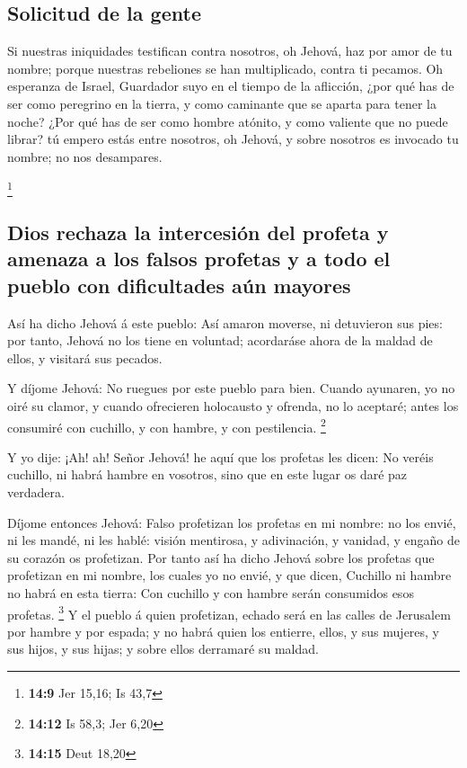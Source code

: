 \hypertarget{solicitud-de-la-gente}{%
\subsection{Solicitud de la gente}\label{solicitud-de-la-gente}}

 Si nuestras iniquidades testifican contra nosotros, oh
Jehová, haz por amor de tu nombre; porque nuestras rebeliones se han
multiplicado, contra ti pecamos.  Oh esperanza de Israel,
Guardador suyo en el tiempo de la aflicción, ¿por qué has de ser como
peregrino en la tierra, y como caminante que se aparta para tener la
noche?  ¿Por qué has de ser como hombre atónito, y como
valiente que no puede librar? tú empero estás entre nosotros, oh Jehová,
y sobre nosotros es invocado tu nombre; no nos desampares.

\footnote{\textbf{14:9} Jer 15,16; Is 43,7}

\hypertarget{dios-rechaza-la-intercesiuxf3n-del-profeta-y-amenaza-a-los-falsos-profetas-y-a-todo-el-pueblo-con-dificultades-auxfan-mayores}{%
\subsection{Dios rechaza la intercesión del profeta y amenaza a los
falsos profetas y a todo el pueblo con dificultades aún
mayores}\label{dios-rechaza-la-intercesiuxf3n-del-profeta-y-amenaza-a-los-falsos-profetas-y-a-todo-el-pueblo-con-dificultades-auxfan-mayores}}

 Así ha dicho Jehová á este pueblo: Así amaron moverse,
ni detuvieron sus pies: por tanto, Jehová no los tiene en voluntad;
acordaráse ahora de la maldad de ellos, y visitará sus pecados.

 Y díjome Jehová: No ruegues por este pueblo para bien.
 Cuando ayunaren, yo no oiré su clamor, y cuando
ofrecieren holocausto y ofrenda, no lo aceptaré; antes los consumiré con
cuchillo, y con hambre, y con pestilencia. \footnote{\textbf{14:12} Is
  58,3; Jer 6,20}

 Y yo dije: ¡Ah! ah! Señor Jehová! he aquí que los
profetas les dicen: No veréis cuchillo, ni habrá hambre en vosotros,
sino que en este lugar os daré paz verdadera.

 Díjome entonces Jehová: Falso profetizan los profetas en
mi nombre: no los envié, ni les mandé, ni les hablé: visión mentirosa, y
adivinación, y vanidad, y engaño de su corazón os profetizan.
 Por tanto así ha dicho Jehová sobre los profetas que
profetizan en mi nombre, los cuales yo no envié, y que dicen, Cuchillo
ni hambre no habrá en esta tierra: Con cuchillo y con hambre serán
consumidos esos profetas. \footnote{\textbf{14:15} Deut 18,20}
 Y el pueblo á quien profetizan, echado será en las
calles de Jerusalem por hambre y por espada; y no habrá quien los
entierre, ellos, y sus mujeres, y sus hijos, y sus hijas; y sobre ellos
derramaré su maldad.

